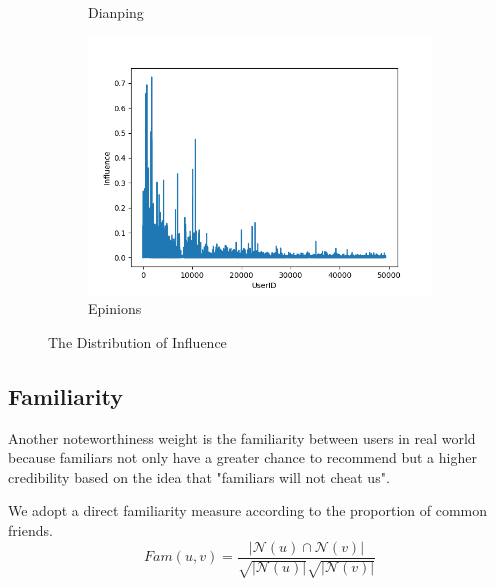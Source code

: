 \documentclass{article}
\begin{document}
\begin{figure}[h]
\begin{subfigure}{0.33\textwidth}
      \caption{Dianping}
    \end{subfigure}%
    \begin{subfigure}{0.33\textwidth}
      \centering
        \includegraphics[width=1\linewidth]{pic/figure3_3.png}
        \caption{Epinions}
    \end{subfigure}
  \caption{The Distribution of Influence}
\end{figure}
\subsection{Familiarity}
Another noteworthiness weight is the familiarity between users in real world
because familiars not only have a greater chance to recommend but a higher credibility 
based on the idea that "familiars will not cheat us". 

We adopt a direct familiarity measure \cite{liang2012pr} according to the proportion of common friends.
\begin{equation}
  {Fam}(u, v) = \frac{|\mathcal{N}(u) \cap \mathcal{N}(v)|}{\sqrt{|\mathcal{N}(u)|} \sqrt{|\mathcal{N}(v)|}}
\end{equation}
\end{document}
